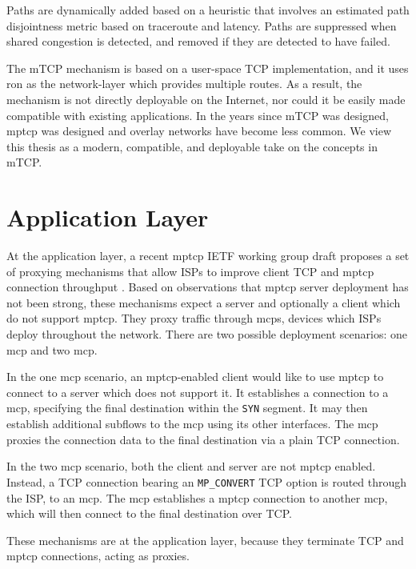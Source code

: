 \documentclass{cwru}
\begin{document}
Paths are dynamically added based on a heuristic that involves an estimated path
disjointness metric based on traceroute and latency. Paths are suppressed when
shared congestion is detected, and removed if they are detected to have failed.

The mTCP mechanism is based on a user-space TCP implementation, and it uses
\ac{ron} \cite{ron} as the network-layer which provides multiple routes. As a
result, the mechanism is not directly deployable on the Internet, nor could it
be easily made compatible with existing applications. In the years since mTCP
was designed, \ac{mptcp} was designed and overlay networks have become less
common. We view this thesis as a modern, compatible, and deployable take on the
concepts in mTCP.

\section{Application Layer}

At the application layer, a recent \ac{mptcp} IETF working group draft proposes
a set of proxying mechanisms that allow ISPs to improve client TCP and
\ac{mptcp} connection throughput \cite{boucadair-mptcp-plain-mode-10}. Based on
observations that \ac{mptcp} server deployment has not been strong, these
mechanisms expect a server and optionally a client which do not support
\ac{mptcp}. They proxy traffic through \acp{mcp}, devices which ISPs deploy
throughout the network. There are two possible deployment scenarios: one
\ac{mcp} and two \ac{mcp}.

In the one \ac{mcp} scenario, an \ac{mptcp}-enabled client would like to use
\ac{mptcp} to connect to a server which does not support it. It establishes a
connection to a \ac{mcp}, specifying the final destination within the
\texttt{SYN} segment. It may then establish additional subflows to the \ac{mcp}
using its other interfaces. The \ac{mcp} proxies the connection data to the
final destination via a plain TCP connection.

In the two \ac{mcp} scenario, both the client and server are not \ac{mptcp}
enabled. Instead, a TCP connection bearing an \texttt{MP\_CONVERT} TCP option is
routed through the ISP, to an \ac{mcp}. The \ac{mcp} establishes a \ac{mptcp}
connection to another \ac{mcp}, which will then connect to the final destination
over TCP.

These mechanisms are at the application layer, because they terminate TCP and
\ac{mptcp} connections, acting as proxies.
\end{document}
